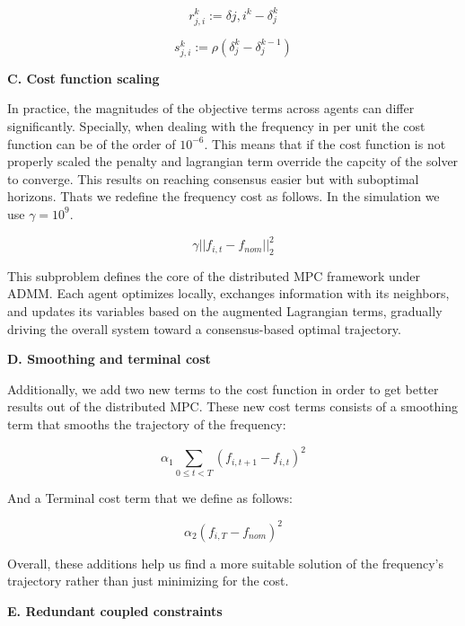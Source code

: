 \documentclass{article}
\begin{document}
\begin{equation}
r_{j,i}^k := \delta{j,i}^k - \delta_j^k
\end{equation}

\begin{equation}
s_{j,i}^k := \rho \left( \delta_j^k - \delta_j^{k-1} \right)
\end{equation}

\textbf{C. Cost function scaling} 

In practice, the magnitudes of the objective terms across agents can differ significantly. Specially, when dealing with the frequency in per unit the cost function can be of the order of $10^{-6}$. This means that if the cost function is not properly scaled the penalty and lagrangian term override the capcity of the solver to converge. This results on reaching consensus easier but with suboptimal horizons. Thats we redefine the frequency cost as follows. In the simulation we use $\gamma = 10^9$.

\begin{equation}
    \gamma ||f_{i,t} - f_{nom}||_2^2
\end{equation}

This subproblem defines the core of the distributed MPC framework under ADMM. Each agent optimizes locally, exchanges information with its neighbors, and updates its variables based on the augmented Lagrangian terms, gradually driving the overall system toward a consensus-based optimal trajectory.

\textbf{D. Smoothing and terminal cost} 

Additionally, we add two new terms to the cost function in order to get better results out of the distributed MPC. These new cost terms consists of a smoothing term that smooths the trajectory of the frequency:

\begin{equation}
    \alpha_1 \sum_{0 \leq t < T}(f_{i,t+1} - f_{i,t})^2 
\end{equation}

And a Terminal cost term that we define as follows:

\begin{equation}
    \alpha_2 (f_{i,T} - f_{nom})^2 
\end{equation}

Overall, these additions help us find a more suitable solution of the frequency's trajectory rather than just minimizing for the cost.

\textbf{E. Redundant coupled constraints} 
\end{document}
